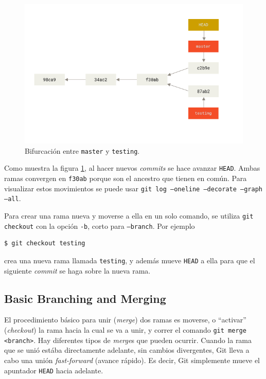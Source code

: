 \documentclass[spanish, 12pt, a4paper]{article}
\begin{document}
\begin{figure}[h]
  \centering
  \includegraphics[width=\textwidth]{figs/advance-master.png}
  \caption{Bifurcación entre \texttt{master} y \texttt{testing}.}
  \label{fig:bifurcacion}
\end{figure}

Como muestra la figura \ref{fig:bifurcacion}, al hacer nuevos \textit{commits} se hace avanzar \texttt{HEAD}.
Ambas ramas convergen en \texttt{f30ab} porque son el ancestro que tienen en común.
Para visualizar estos movimientos se puede usar \texttt{git log --oneline --decorate --graph --all}.

Para crear una rama nueva y moverse a ella en un solo comando, se utiliza \texttt{git checkout} con la opción \texttt{-b}, corto para \texttt{--branch}.
Por ejemplo
\begin{lstlisting}
$ git checkout testing
\end{lstlisting}
crea una nueva rama llamada \texttt{testing}, y además mueve \texttt{HEAD} a ella para que el siguiente \textit{commit} se haga sobre la nueva rama.

\subsection{Basic Branching and Merging}
El procedimiento básico para unir (\textit{merge}) dos ramas es moverse, o ``activar'' (\textit{checkout}) la rama hacia la cual se va a unir, y correr el comando \texttt{git merge <branch>}.
Hay diferentes tipos de \textit{merge}s que pueden ocurrir.
Cuando la rama que se unió estába directamente adelante, sin cambios divergentes, Git lleva a cabo una unión \textit{fast-forward} (avance rápido).
Es decir, Git simplemente mueve el apuntador \texttt{HEAD} hacia adelante.
\end{document}
